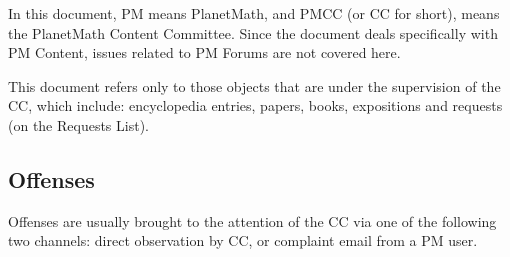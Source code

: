 In this document, PM means PlanetMath, and PMCC (or CC for short), means the PlanetMath Content Committee. Since the document deals specifically with PM Content, issues related to PM Forums are not covered here.

This document refers only to those objects that are under the supervision of the CC, which include: encyclopedia entries, papers, books, expositions and requests (on the Requests List).

\subsection*{Offenses}

Offenses are usually brought to the attention of the CC via one of the following two channels: direct observation by CC, or complaint email from a PM user.\\

